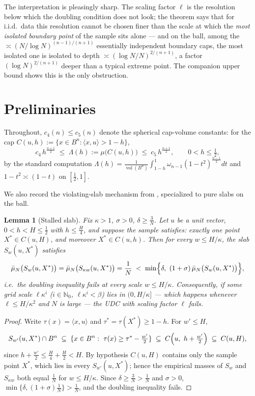 \documentclass[11pt]{article}
\newtheorem{lemma}[theorem]{Lemma}
\newcommand{\emp}{\bar\mu_N}
\newcommand{\vol}{\operatorname{vol}}
\begin{document}
The interpretation is pleasingly sharp.  The scaling factor $\ell$ is the
resolution below which the doubling condition does not look; the theorem says
that for i.i.d.\ data this resolution cannot be chosen finer than the scale at
which the \emph{most isolated boundary point} of the sample sits alone --- and
on the ball, among the $\asymp(N/\log N)^{(n-1)/(n+1)}$ essentially
independent boundary caps, the most isolated one is isolated to depth
$\asymp(\log N/N)^{2/(n+1)}$, a factor $(\log N)^{2/(n+1)}$ deeper than a
typical extreme point.  The companion upper bound shows this is the only
obstruction.

\section{Preliminaries}\label{sec:prelim}

Throughout, $c_4(n)\le c_5(n)$ denote the spherical cap-volume constants: for
the cap $C(u,h):=\{x\in B^n:\langle x,u\rangle>1-h\}$,
\begin{equation}\label{eq:cap}
c_4\,h^{\frac{n+1}2}\;\le\;\Lambda(h):=\mu\bigl(C(u,h)\bigr)\;\le\;
c_5\,h^{\frac{n+1}2},
\qquad 0<h\le\tfrac12,
\end{equation}
by the standard computation
$\Lambda(h)=\frac{1}{\vol(B^n)}\int_{1-h}^1\omega_{n-1}(1-t^2)^{\frac{n-1}2}dt$
and $1-t^2\asymp(1-t)$ on $[\frac12,1]$.

We also record the violating-slab mechanism from
\cite[Theorem 1.3]{companion3}, specialized to pure slabs on the ball.

\begin{lemma}[Stalled slab]\label{lem:stall}
Fix $\kappa>1$, $\sigma>0$, $\delta\ge\frac3N$.  Let $u$ be a unit vector,
$0<h<H\le\frac12$ with $h\le\frac H{4}$, and suppose the sample satisfies:
exactly one point $X^*\in C(u,H)$, and moreover $X^*\in C(u,h)$.  Then for
every $w\le H/\kappa$, the slab $S_w(u,X^*)$ satisfies
\[
\emp\bigl(S_w(u,X^*)\bigr)=\emp\bigl(S_{\kappa w}(u,X^*)\bigr)=\frac1N
\;<\;\min\Bigl\{\delta,\ (1+\sigma)\,\emp\bigl(S_w(u,X^*)\bigr)\Bigr\},
\]
i.e.\ the doubling inequality fails at every scale $w\le H/\kappa$.
Consequently, if some grid scale $\ell\kappa^i$ ($i\in\mathbb N_0$,
$\ell\kappa^i<\beta$) lies in $(0,H/\kappa]$ --- which happens whenever
$\ell\le H/\kappa^2$ and $N$ is large --- the UDC with scaling factor $\ell$
fails.
\end{lemma}

\begin{proof}
Write $\tau(x)=\langle x,u\rangle$ and $\tau^*=\tau(X^*)\ge1-h$.  For
$w'\le H$,
\[
S_{w'}(u,X^*)\cap B^n\;\subseteq\;\{x\in B^n:\ \tau(x)\ge\tau^*-\tfrac{w'}2\}
\;\subseteq\;C\Bigl(u,\ h+\tfrac{w'}2\Bigr)\;\subseteq\;C(u,H),
\]
since $h+\frac{w'}2\le\frac H4+\frac H2<H$.  By hypothesis $C(u,H)$ contains
only the sample point $X^*$, which lies in every $S_{w'}(u,X^*)$; hence the
empirical masses of $S_w$ and $S_{\kappa w}$ both equal $\frac1N$ for
$w\le H/\kappa$.  Since $\delta\ge\frac3N>\frac1N$ and $\sigma>0$,
$\min\{\delta,(1+\sigma)\frac1N\}>\frac1N$, and the doubling inequality fails.
\end{proof}
\end{document}
